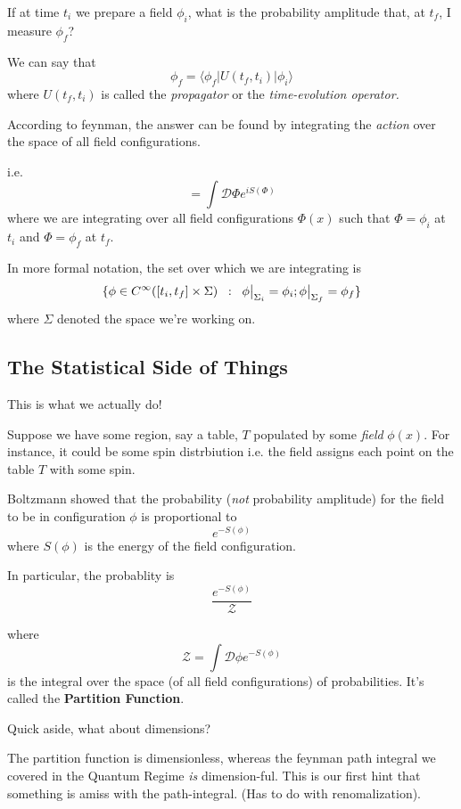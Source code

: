 \documentclass{article}
\newcommand{\inner}[2]{\langle #1 | #2 \rangle}
\newcommand{\restr}[2]{{%
  \left.\kern-\nulldelimiterspace %
  #1 %
  \vphantom{\big|} %
  \right|_{#2} %
  }}
\begin{document}
\begin{dottedbox}
  If at time $t_i$ we prepare a field $\phi_i$, what is the probability amplitude that, at $t_f$, I measure $\phi_f$?
\end{dottedbox}

We can say that 
\[ \phi_f = \inner{\phi_f}{U(t_f, t_i)| \phi_i} \]
where $U(t_f, t_i)$ is called the \emph{propagator} or the \emph{time-evolution operator.}


According to feynman, the answer can be found by integrating the \emph{action} over the space of all field configurations.



i.e.
\[ = \int \mathcal{D}\Phi e^{i S(\Phi)} \]
where we are integrating over all field configurations $\Phi(x)$ such that $\Phi = \phi_i$ at $t_i$ and $\Phi = \phi_f$ at $t_f$.



In more formal notation, the set over which we are integrating is
\[ \{ \phi \in C^{\infty}([t_i, t_f] \times \Sigma) \;\;:\;\; \restr{\phi}{\Sigma_i} = \phi_i; \restr{\phi}{\Sigma_f} = \phi_f \} \] where $\Sigma$ denoted the space we're working on.


\vskip 0.5cm
\subsection{The Statistical Side of Things}
This is what we actually do! 

\vskip 0.5cm
Suppose we have some region, say a table, $T$ populated by some \emph{field} $\phi(x)$. For instance, it could be some spin distrbiution i.e. the field assigns each point on the table $T$ with some spin.

\vskip 0.5cm
Boltzmann showed that the probability (\emph{not} probability amplitude) for the field to be in configuration $\phi$ is proportional to 
\[ e^{-S(\phi)} \]
where $S(\phi)$ is the energy of the field configuration.

\vskip 0.5cm
In particular, the probablity is 
\[ \frac{e^{-S(\phi)}}{\mathcal{Z}} \]

where 
\[ \mathcal{Z} = \int \mathcal{D}\phi e^{-S(\phi)} \]
is the integral over the space (of all field configurations) of probabilities. It's called the \textbf{Partition Function}.

\vskip 0.5cm
\begin{dottedbox}
  Quick aside, what about dimensions? 

  \vskip 0.5cm
  The partition function is dimensionless, whereas the feynman path integral we covered in the Quantum Regime \emph{is} dimension-ful. This is our first hint that something is amiss with the path-integral. (Has to do with renomalization).
\end{dottedbox}
\end{document}
